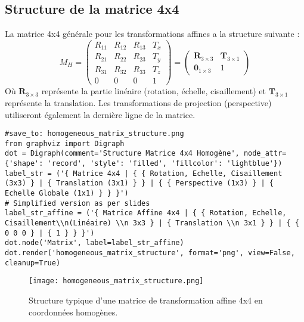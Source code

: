 \subsection{Structure de la matrice 4x4}
La matrice 4x4 générale pour les transformations affines a la structure suivante :
\[ M_H = \begin{pmatrix}
R_{11} & R_{12} & R_{13} & T_x \\
R_{21} & R_{22} & R_{23} & T_y \\
R_{31} & R_{32} & R_{33} & T_z \\
0 & 0 & 0 & 1
\end{pmatrix}
=
\begin{pmatrix}
\mathbf{R}_{3 \times 3} & \mathbf{T}_{3 \times 1} \\
\mathbf{0}_{1 \times 3} & 1
\end{pmatrix}
\]
Où \( \mathbf{R}_{3 \times 3} \) représente la partie linéaire (rotation, échelle, cisaillement) et \( \mathbf{T}_{3 \times 1} \) représente la translation.
Les transformations de projection (perspective) utiliseront également la dernière ligne de la matrice.
\begin{verbatim}
#save_to: homogeneous_matrix_structure.png
from graphviz import Digraph
dot = Digraph(comment='Structure Matrice 4x4 Homogène', node_attr={'shape': 'record', 'style': 'filled', 'fillcolor': 'lightblue'})
label_str = ('{ Matrice 4x4 | { { Rotation, Echelle, Cisaillement (3x3) } | { Translation (3x1) } } | { { Perspective (1x3) } | { Echelle Globale (1x1) } } }')
# Simplified version as per slides
label_str_affine = ('{ Matrice Affine 4x4 | { { Rotation, Echelle, Cisaillement\\n(Linéaire) \\n 3x3 } | { Translation \\n 3x1 } } | { { 0 0 0 } | { 1 } } }')
dot.node('Matrix', label=label_str_affine)
dot.render('homogeneous_matrix_structure', format='png', view=False, cleanup=True)
\end{verbatim}
\begin{figure}[H]
\centering
\texttt{[image: homogeneous\_matrix\_structure.png]}
\caption{Structure typique d'une matrice de transformation affine 4x4 en coordonnées homogènes.}
\label{fig:homogeneous_matrix_structure}
\end{figure}
